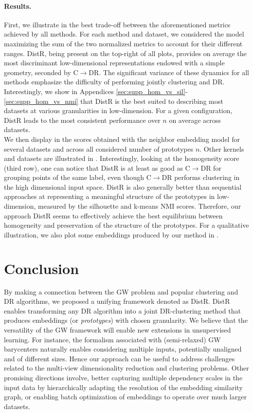\paragraph{Results.} 
First, we illustrate in  the best trade-off between the aforementioned metrics achieved by all methods.  %
For each method and dataset, we considered the model maximizing the sum of the
two normalized metrics to account for their different ranges. DistR, being
present on the top-right of all plots, provides on average the most discriminant
low-dimensional representations endowed with a simple geometry, seconded by
C$\rightarrow$DR. The significant variance of these dynamics for all methods
emphasize the difficulty of performing jointly clustering and DR.
Interestingly, we show in Appendices
\ref{sec:supp_hom_vs_sil}-\ref{sec:supp_hom_vs_nmi} that DistR is the best
suited to describing most datasets at various granularities in low-dimension. %
For a given configuration, DistR leads to the most consistent performance over
$n$ on average across datasets.\\
We then display in   the scores obtained with the neighbor embedding model for several datasets and across all considered number of prototypes $n$. Other kernels and datasets are illustrated in %
. Interestingly, looking at the homogeneity score
(third row), one can notice that DistR is at least as good as C$\to$DR for
grouping points of the same label, even though C$\to$DR performs clustering in
the high dimensional input space. DistR is also generally better than sequential
approaches at representing a meaningful structure of the prototypes in
low-dimension, measured by the silhouette and k-means NMI scores. Therefore, our
approach DistR seems to effectively achieve the best equilibrium between
homogeneity and preservation of the structure of the prototypes. For a
qualitative illustration, we also plot some embeddings produced by our method in
.

\section{Conclusion}
By making a connection between the GW problem and popular clustering and DR
algorithms, we proposed a unifying framework denoted as DistR.
DistR enables transforming any DR algorithm into a joint DR-clustering method that produces embeddings (or \emph{prototypes}) with chosen granularity.
We believe that the versatility of the GW framework will enable new extensions in unsupervised learning.
For instance, the formalism associated with (semi-relaxed) GW barycenters naturally enables considering multiple inputs, potentially unaligned and of different sizes. Hence our approach can be useful to address challenges related to the multi-view dimensionality reduction and clustering problems. Other promising directions involve, better capturing multiple dependency scales in the input data by hierarchically adapting the resolution of the embedding similarity graph, or enabling batch optimization of embeddings to operate over much larger datasets.